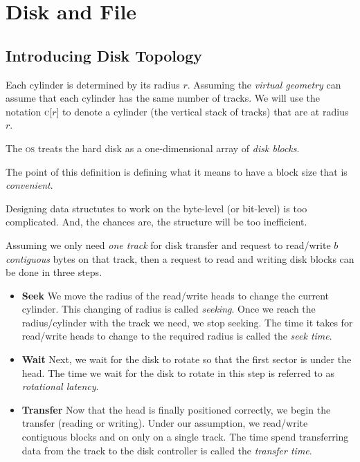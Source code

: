 
\chapter{Disk and File}


\section{Introducing Disk Topology}





Each cylinder is determined by its radius $r$. 
Assuming the \textit{virtual geometry} can assume that each cylinder 
has the same number of tracks. 
We will use the notation \textsc{c}[$r$] to denote a cylinder 
(the vertical stack of tracks) that are at radius $r$. 


The \textsc{os} treats the hard disk as a one-dimensional array of \textit{disk blocks}.


The point of this definition is defining 
what it means to have a block size that is \textit{convenient}.

Designing data structutes to work on the byte-level (or bit-level) is too complicated. 
And, the chances are, the structure will be too inefficient.

\frmrule

Assuming we only need \textit{one track} for disk transfer and 
request to read/write $b$ \textit{contiguous} bytes on that track, then
a request to read and writing disk blocks can be done in three steps. 

\begin{itemize}   
\renewcommand{\labelitemi}{$\Box$}
\item \textbf{Seek}
We move the radius of the read/write heads to change the current cylinder.
This changing of radius is called \textit{seeking}. Once we reach the 
radius/cylinder with the track we need, we stop seeking.
The time it takes for read/write heads to change to the required radius is 
called the \textit{seek time}.
\item \textbf{Wait}
Next, we wait for the disk to rotate so that the first sector is under the head.
The time we wait for the disk to rotate in this step is referred to as 
\textit{rotational latency}.
\item \textbf{Transfer}
Now that the head is finally positioned correctly, we begin the transfer 
(reading or writing). Under our assumption, we read/write contiguous blocks 
and on only on a single track.
The time spend transferring data from the track to the disk controller
is called the \textit{transfer time}.
\end{itemize}



